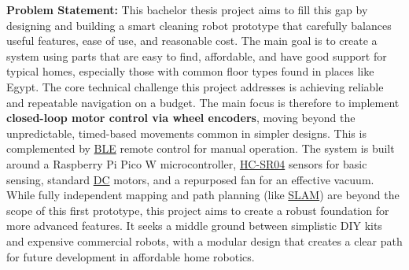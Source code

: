 \textbf{Problem Statement:}
This bachelor thesis project aims to fill this gap by designing and building a smart cleaning robot prototype that carefully balances useful features, ease of use, and reasonable cost. The main goal is to create a system using parts that are easy to find, affordable, and have good support for typical homes, especially those with common floor types found in places like Egypt.
The core technical challenge this project addresses is achieving reliable and repeatable navigation on a budget. The main focus is therefore to implement \textbf{closed-loop motor control via wheel encoders}, moving beyond the unpredictable, timed-based movements common in simpler designs. This is complemented by \hyperref[term:ble]{BLE} remote control for manual operation. The system is built around a Raspberry Pi Pico W microcontroller, \hyperref[term:hcsr04]{HC-SR04} sensors for basic sensing, standard \hyperref[term:dc]{DC} motors, and a repurposed fan for an effective vacuum. While fully independent mapping and path planning (like \hyperref[term:slam]{SLAM}) are beyond the scope of this first prototype, this project aims to create a robust foundation for more advanced features. It seeks a middle ground between simplistic DIY kits and expensive commercial robots, with a modular design that creates a clear path for future development in affordable home robotics.